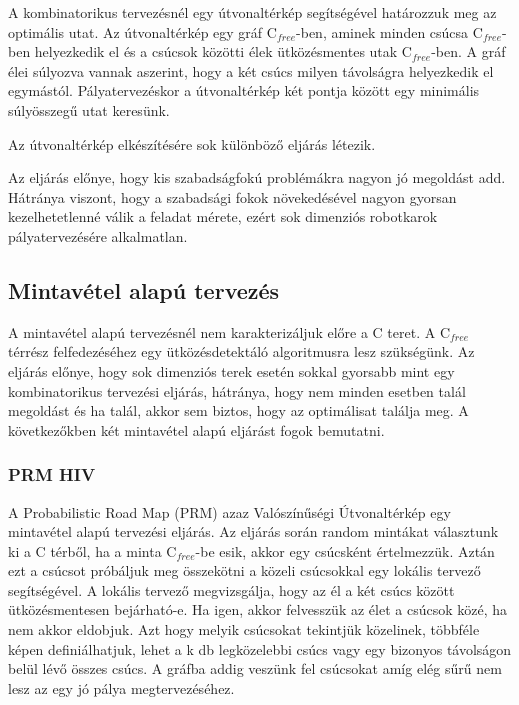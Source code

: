 A kombinatorikus tervezésnél egy útvonaltérkép segítségével határozzuk meg az optimális utat. Az útvonaltérkép egy gráf C$_{free}$-ben, aminek minden csúcsa C$_{free}$-ben helyezkedik el és a csúcsok közötti élek ütközésmentes utak C$_{free}$-ben. A gráf élei súlyozva vannak aszerint, hogy a két csúcs milyen távolságra helyezkedik el egymástól. Pályatervezéskor a útvonaltérkép két pontja között egy minimális súlyösszegű utat keresünk.

Az útvonaltérkép elkészítésére sok különböző eljárás létezik.

Az eljárás előnye, hogy kis szabadságfokú problémákra nagyon jó megoldást add. Hátránya viszont, hogy a szabadsági fokok növekedésével nagyon gyorsan kezelhetetlenné válik a feladat mérete, ezért sok dimenziós robotkarok pályatervezésére alkalmatlan.

\subsection{Mintavétel alapú tervezés}

A mintavétel alapú tervezésnél nem karakterizáljuk előre a C teret. A C$_{free}$ térrész felfedezéséhez egy ütközésdetektáló algoritmusra lesz szükségünk. Az eljárás előnye, hogy sok dimenziós terek esetén sokkal gyorsabb mint egy kombinatorikus tervezési eljárás, hátránya, hogy nem minden esetben talál megoldást és ha talál, akkor sem biztos, hogy az optimálisat találja meg. A következőkben két mintavétel alapú eljárást fogok bemutatni.

\subsubsection{PRM HIV}

A Probabilistic Road Map (PRM) azaz Valószínűségi Útvonaltérkép egy mintavétel alapú tervezési eljárás. Az eljárás során random mintákat választunk ki a C térből, ha a minta C$_{free}$-be esik, akkor egy csúcsként értelmezzük. Aztán ezt a csúcsot próbáljuk meg összekötni a közeli csúcsokkal egy lokális tervező segítségével. A lokális tervező megvizsgálja, hogy az él a két csúcs között ütközésmentesen bejárható-e. Ha igen, akkor felvesszük az élet a csúcsok közé, ha nem akkor eldobjuk. Azt hogy melyik csúcsokat tekintjük közelinek, többféle képen definiálhatjuk, lehet a k db legközelebbi csúcs vagy egy bizonyos távolságon belül lévő összes csúcs. A gráfba addig veszünk fel csúcsokat amíg elég sűrű nem lesz az egy jó pálya megtervezéséhez.

